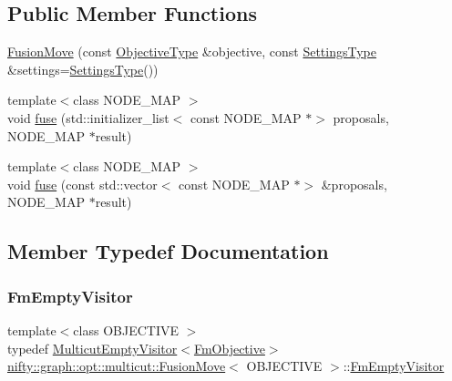 \subsection*{Public Member Functions}
\begin{DoxyCompactItemize}
\item 
\hyperlink{classnifty_1_1graph_1_1opt_1_1multicut_1_1FusionMove_a2f7fd8e8cbf6f20d2ef0f136ea35b71c}{Fusion\+Move} (const \hyperlink{classnifty_1_1graph_1_1opt_1_1multicut_1_1FusionMove_ab700a686e5eff05008757b9a2b707111}{Objective\+Type} \&objective, const \hyperlink{structnifty_1_1graph_1_1opt_1_1multicut_1_1FusionMove_1_1SettingsType}{Settings\+Type} \&settings=\hyperlink{structnifty_1_1graph_1_1opt_1_1multicut_1_1FusionMove_1_1SettingsType}{Settings\+Type}())
\item 
{\footnotesize template$<$class N\+O\+D\+E\+\_\+\+M\+AP $>$ }\\void \hyperlink{classnifty_1_1graph_1_1opt_1_1multicut_1_1FusionMove_a4ed48452a9c5d480b9e8c09a6ec74905}{fuse} (std\+::initializer\+\_\+list$<$ const N\+O\+D\+E\+\_\+\+M\+AP $\ast$$>$ proposals, N\+O\+D\+E\+\_\+\+M\+AP $\ast$result)
\item 
{\footnotesize template$<$class N\+O\+D\+E\+\_\+\+M\+AP $>$ }\\void \hyperlink{classnifty_1_1graph_1_1opt_1_1multicut_1_1FusionMove_a87e522e6d4cb2a40544be4f2a05cb49c}{fuse} (const std\+::vector$<$ const N\+O\+D\+E\+\_\+\+M\+AP $\ast$$>$ \&proposals, N\+O\+D\+E\+\_\+\+M\+AP $\ast$result)
\end{DoxyCompactItemize}


\subsection{Member Typedef Documentation}
\mbox{\label{classnifty_1_1graph_1_1opt_1_1multicut_1_1FusionMove_a6d3c7094e63b5ae54f305761e0416f5e}} 
\subsubsection{\texorpdfstring{Fm\+Empty\+Visitor}{FmEmptyVisitor}}
{\footnotesize\ttfamily template$<$class O\+B\+J\+E\+C\+T\+I\+VE $>$ \\
typedef \hyperlink{namespacenifty_1_1graph_1_1opt_1_1multicut_aa5367b6f47794a63333b96b04502396c}{Multicut\+Empty\+Visitor}$<$\hyperlink{classnifty_1_1graph_1_1opt_1_1multicut_1_1FusionMove_a024e1871ed861501626de8e65dfa31a6}{Fm\+Objective}$>$ \hyperlink{classnifty_1_1graph_1_1opt_1_1multicut_1_1FusionMove}{nifty\+::graph\+::opt\+::multicut\+::\+Fusion\+Move}$<$ O\+B\+J\+E\+C\+T\+I\+VE $>$\+::\hyperlink{classnifty_1_1graph_1_1opt_1_1multicut_1_1FusionMove_a6d3c7094e63b5ae54f305761e0416f5e}{Fm\+Empty\+Visitor}}

